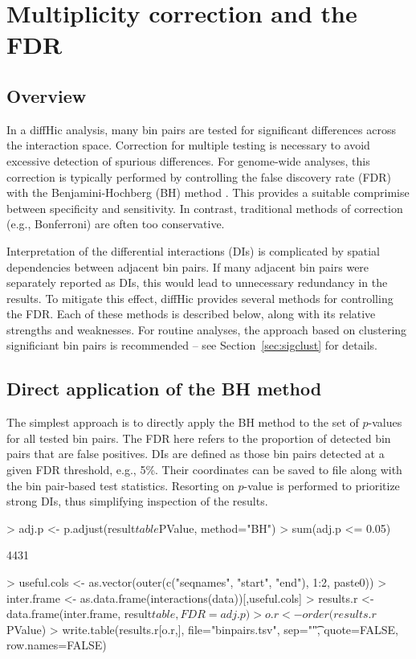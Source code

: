 \documentclass[12pt]{report}
\renewenvironment{Schunk}{\vspace{0pt}}{\vspace{0pt}}
\newcommand{\pkgname}{diffHic}
\begin{document}
\section{Multiplicity correction and the FDR}

\subsection{Overview}
In a \pkgname{} analysis, many bin pairs are tested for significant differences across the interaction space.
Correction for multiple testing is necessary to avoid excessive detection of spurious differences.
For genome-wide analyses, this correction is typically performed by controlling the false discovery rate (FDR) with the Benjamini-Hochberg (BH) method \citep{benjamini1995fdr}. 
This provides a suitable comprimise between specificity and sensitivity.
In contrast, traditional methods of correction (e.g., Bonferroni) are often too conservative.

Interpretation of the differential interactions (DIs) is complicated by spatial dependencies between adjacent bin pairs.
If many adjacent bin pairs were separately reported as DIs, this would lead to unnecessary redundancy in the results.
To mitigate this effect, \pkgname{} provides several methods for controlling the FDR.
Each of these methods is described below, along with its relative strengths and weaknesses.
For routine analyses, the approach based on clustering significiant bin pairs is recommended -- see Section~\ref{sec:sigclust} for details.

\subsection{Direct application of the BH method}
The simplest approach is to directly apply the BH method to the set of $p$-values for all tested bin pairs.
The FDR here refers to the proportion of detected bin pairs that are false positives.
DIs are defined as those bin pairs detected at a given FDR threshold, e.g., 5\%.
Their coordinates can be saved to file along with the bin pair-based test statistics.
Resorting on $p$-value is performed to prioritize strong DIs, thus simplifying inspection of the results.

\begin{Schunk}
\begin{Sinput}
> adj.p <- p.adjust(result$table$PValue, method="BH")
> sum(adj.p <= 0.05)
\end{Sinput}
\begin{Soutput}
[1] 4431
\end{Soutput}
\begin{Sinput}
> useful.cols <- as.vector(outer(c("seqnames", "start", "end"), 1:2, paste0))
> inter.frame <- as.data.frame(interactions(data))[,useful.cols]
> results.r <- data.frame(inter.frame, result$table, FDR=adj.p)
> o.r <- order(results.r$PValue)
> write.table(results.r[o.r,], file="binpairs.tsv", sep="\t", quote=FALSE, row.names=FALSE)
\end{Sinput}
\end{Schunk}
\end{document}
